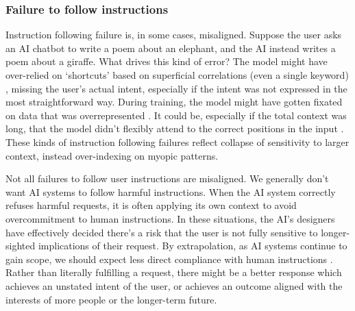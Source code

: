 \documentclass[12pt]{article}
\begin{document}


\subsubsection{Failure to follow instructions}


Instruction following failure is, in some cases, misaligned. Suppose the user asks an AI chatbot to write a poem about an elephant, and the AI instead writes a poem about a giraffe. What drives this kind of error? The model might have over-relied on `shortcuts' based on superficial correlations (even a single keyword) \citep{geirhos2020shortcut}, missing the user's actual intent, especially if the intent was not expressed in the most straightforward way. During training, the model might have gotten fixated on data that was overrepresented \citep{zhao2021calibrate,reynolds2021prompt,xu2024knowledge}. It could be, especially if the total context was long, that the model didn't flexibly attend to the correct positions in the input \citep{liu2024lost}. These kinds of instruction following failures reflect collapse of sensitivity to larger context, instead over-indexing on myopic patterns.

Not all failures to follow user instructions are misaligned. We generally don't want AI systems to follow harmful instructions. When the AI system correctly refuses harmful requests, it is often applying its own context to avoid overcommitment to human instructions. In these situations, the AI's designers have effectively decided there's a risk that the user is not fully sensitive to longer-sighted implications of their request. By extrapolation, as AI systems continue to gain scope, we should expect less direct compliance with human instructions \citep{hadfieldmenell2016cooperative,bostrom2014superintelligence,russell2019human, milli2017should, yudkowsky2004coherent}. Rather than literally fulfilling a request, there might be a better response which achieves an unstated intent of the user, or achieves an outcome aligned with the interests of more people or the longer-term future.
\end{document}
